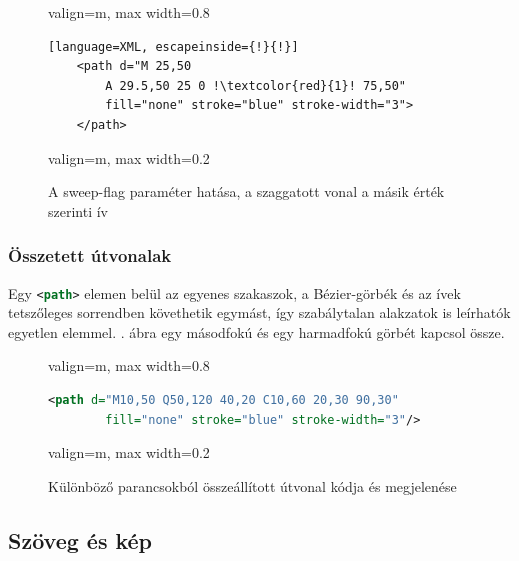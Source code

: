 \begin{figure}[H]
    \centering
    \begin{adjustbox}{valign=m, max width=0.8\textwidth}
        \begin{lstlisting}[language=XML, escapeinside={!}{!}]
    <path d="M 25,50
        A 29.5,50 25 0 !\textcolor{red}{1}! 75,50"
        fill="none" stroke="blue" stroke-width="3">
    </path>
        \end{lstlisting}
    \end{adjustbox}
    \hfill
    \begin{adjustbox}{valign=m, max width=0.2\textwidth}
        
    \end{adjustbox}
    \caption{A sweep-flag paraméter hatása, a szaggatott vonal a másik érték szerinti ív}
    \label{fig:example_arc_sweep}
\end{figure}


\subsubsection{Összetett útvonalak}

Egy \lstinline[language=XML]|<path>| elemen belül az egyenes szakaszok, a Bézier-görbék és az ívek tetszőleges sorrendben követhetik egymást, így szabálytalan alakzatok is leírhatók egyetlen elemmel. . ábra egy másodfokú és egy harmadfokú görbét kapcsol össze.

\begin{figure}[H]
    \centering
    \begin{adjustbox}{valign=m, max width=0.8\textwidth}
        \begin{lstlisting}[language=XML]
    <path d="M10,50 Q50,120 40,20 C10,60 20,30 90,30"
        fill="none" stroke="blue" stroke-width="3"/>
        \end{lstlisting}
    \end{adjustbox}
    \hfill
    \begin{adjustbox}{valign=m, max width=0.2\textwidth}
        
    \end{adjustbox}
    \caption{Különböző parancsokból összeállított útvonal kódja és megjelenése}
    \label{fig:example_freehand}
\end{figure}


\subsection{Szöveg és kép}
\label{sub:other_elements}

